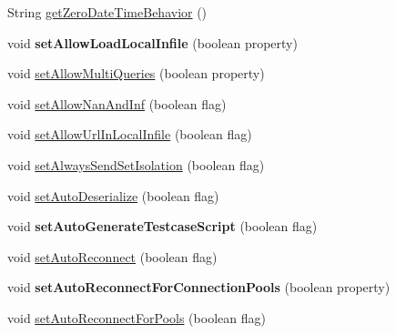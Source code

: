 \begin{DoxyCompactItemize}
String \mbox{\hyperlink{classcom_1_1mysql_1_1jdbc_1_1_connection_properties_impl_afdf94172a5573fd5993f1253bf82ac20}{get\+Zero\+Date\+Time\+Behavior}} ()
\item 
\mbox{\label{classcom_1_1mysql_1_1jdbc_1_1_connection_properties_impl_ae52bb115d51cca98050d32001fc41c0a}} 
void {\bfseries set\+Allow\+Load\+Local\+Infile} (boolean property)
\item 
void \mbox{\hyperlink{classcom_1_1mysql_1_1jdbc_1_1_connection_properties_impl_aa805cde72f5aa791da69e67346678199}{set\+Allow\+Multi\+Queries}} (boolean property)
\item 
void \mbox{\hyperlink{classcom_1_1mysql_1_1jdbc_1_1_connection_properties_impl_ae6401b4d87aff1da9d52fb7def821df3}{set\+Allow\+Nan\+And\+Inf}} (boolean flag)
\item 
void \mbox{\hyperlink{classcom_1_1mysql_1_1jdbc_1_1_connection_properties_impl_ab8ebf032ddbdb9dfc7481bf877915c58}{set\+Allow\+Url\+In\+Local\+Infile}} (boolean flag)
\item 
void \mbox{\hyperlink{classcom_1_1mysql_1_1jdbc_1_1_connection_properties_impl_afe03bb85e0693039ebca61c4ec9e3c8f}{set\+Always\+Send\+Set\+Isolation}} (boolean flag)
\item 
void \mbox{\hyperlink{classcom_1_1mysql_1_1jdbc_1_1_connection_properties_impl_a819dd20bf495545134c0956fb56ac020}{set\+Auto\+Deserialize}} (boolean flag)
\item 
\mbox{\label{classcom_1_1mysql_1_1jdbc_1_1_connection_properties_impl_af677b47e07833c7da6b3fdf4dd5a2ccf}} 
void {\bfseries set\+Auto\+Generate\+Testcase\+Script} (boolean flag)
\item 
void \mbox{\hyperlink{classcom_1_1mysql_1_1jdbc_1_1_connection_properties_impl_ad6ee40ab61735068bba0e16798ac8606}{set\+Auto\+Reconnect}} (boolean flag)
\item 
\mbox{\label{classcom_1_1mysql_1_1jdbc_1_1_connection_properties_impl_a565a419deb898daae5c9ddacc9ad372f}} 
void {\bfseries set\+Auto\+Reconnect\+For\+Connection\+Pools} (boolean property)
\item 
void \mbox{\hyperlink{classcom_1_1mysql_1_1jdbc_1_1_connection_properties_impl_a4c1e9d8e06680eeaaa1a916289f55f1e}{set\+Auto\+Reconnect\+For\+Pools}} (boolean flag)
\item 

\end{DoxyCompactItemize}
